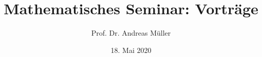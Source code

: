 %
%
%


\beamertemplatenavigationsymbolsempty
\title[MathSem]{Mathematisches Seminar: Vorträge}
\author[A.~Müller]{Prof. Dr. Andreas Müller}
\date[]{18. Mai 2020}

